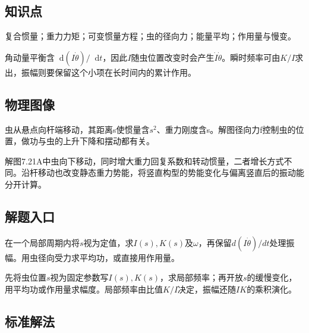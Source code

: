\documentclass[UTF8,fontset=fandol,a4paper,11pt]{ctexart}
\newcommand{\dd}{\mathop{}\!\mathrm{d}}
\begin{document}


\subsection*{知识点}

复合惯量；重力力矩；可变惯量方程；虫的径向力；能量平均；作用量与慢变。

角动量平衡含$\dd(I\dot\theta)/\dd t$，因此$I$随虫位置改变时会产生$\dot I\dot\theta$。瞬时频率可由$K/I$求出，振幅则要保留这个小项在长时间内的累计作用。




\subsection*{物理图像}

虫从悬点向杆端移动，其距离s使惯量含\(s^{2}\)、重力刚度含s。解图径向力f控制虫的位置，做功与虫的上升下降和摆动都有关。

解图7.21A中虫向下移动，同时增大重力回复系数和转动惯量，二者增长方式不同。沿杆移动也改变静态重力势能，将竖直构型的势能变化与偏离竖直后的振动能分开计算。




\subsection*{解题入口}

在一个局部周期内将$s$视为定值，求\(I(s),K(s)\)及\(\omega\)，再保留\(d(I\dot\theta)/dt\)处理振幅。用虫径向受力求平均功，或直接用作用量。

先将虫位置$s$视为固定参数写$I(s),K(s)$，求局部频率；再开放$s$的缓慢变化，用平均功或作用量求幅度。局部频率由比值$K/I$决定，振幅还随$I K$的乘积演化。





\subsection*{标准解法}
\end{document}
